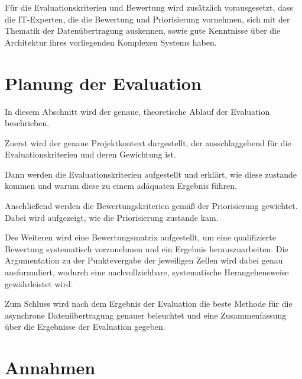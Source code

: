 Für die Evaluationskriterien und Bewertung wird zusätzlich vorausgesetzt, dass die IT-Experten, die die Bewertung und Priorisierung vornehmen, sich mit der Thematik der Datenübertragung auskennen, sowie gute Kenntnisse über die Architektur ihres vorliegenden Komplexen Systems haben.

\section{Planung der Evaluation}
In diesem Abschnitt wird der genaue, theoretische Ablauf der Evaluation beschrieben. 

Zuerst wird der genaue Projektkontext dargestellt, der ausschlaggebend für die Evaluationskriterien und deren Gewichtung ist.

Dann werden die Evaluationskriterien aufgestellt und erklärt, wie diese zustande kommen und warum diese zu einem adäquaten Ergebnis führen. 

Anschließend werden die Bewertungskriterien gemäß der Priorisierung gewichtet. Dabei wird aufgezeigt, wie die Priorisierung zustande kam. 

Des Weiteren wird eine Bewertungsmatrix aufgestellt, um eine qualifizierte Bewertung systematisch vorzunehmen und ein Ergebnis herauszuarbeiten. Die Argumentation zu der Punktevergabe der jeweiligen Zellen wird dabei genau ausformuliert, wodurch eine nachvollziehbare, systematische Herangehensweise gewährleistet wird. 

Zum Schluss wird nach dem Ergebnis der Evaluation die beste Methode für die asynchrone Datenübertragung genauer beleuchtet und eine Zusammenfassung über die Ergebnisse der Evaluation gegeben.

\section{Annahmen}